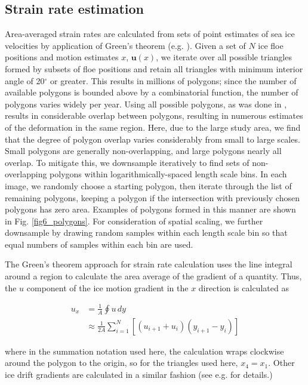 \documentclass[aog]{igs}
\begin{document}
\subsection{Strain rate estimation}
Area-averaged strain rates are calculated from sets of point estimates of sea ice velocities by application of Green's theorem (e.g. \cite{kwok2003_SubdailySea, Hutchings2012, rampal2019_MultifractalScaling, Dierking2020}).
Given a set of $N$ ice floe positions and motion estimates $x$,  $\mathbf{u}(x)$, we iterate over all possible triangles formed by subsets of floe positions and retain all triangles with minimum interior angle of 20$^\circ$ or greater.
This results in millions of polygons; since the number of available polygons is bounded above by a combinatorial function, the number of polygons varies widely per year. 
Using all possible polygons, as was done in \cite{itkin2017_ThinIce}, results in considerable overlap between polygons, resulting in numerous estimates of the deformation in the same region. Here, due to the large study area, we find that the degree of polygon overlap varies considerably from small to large scales. Small polygons are generally non-overlapping, and large polygons nearly all overlap. To mitigate this, we downsample iteratively to find sets of non-overlapping polygons within logarithmically-spaced length scale bins. In each image, we randomly choose a starting polygon, then iterate through the list of remaining polygons, keeping a polygon if the intersection with previously chosen polygons has zero area.
Examples of polygons formed in this manner are shown in Fig. \ref{fig6_polygons}.
For consideration of spatial scaling, we further downsample by drawing random samples within each length scale bin so that equal numbers of samples within each bin are used.

The Green's theorem approach for strain rate calculation uses the line integral around a region to calculate the area average of the gradient of a quantity.
Thus, the $u$ component of the ice motion gradient in the $x$ direction is calculated as
\begin{linenomath*}
\begin{align}
u_x & = \frac 1A \oint u \, dy \nonumber\\ 
& \approx  \frac{1}{2A} \sum_{i=1}^N \left[(u_{i+1} + u_i)(y_{i+1} - y_i)\right]
\end{align}
\end{linenomath*}
where in the summation notation used here, the calculation wraps clockwise around the polygon to the origin, so for the triangles used here, $x_4 = x_1$. Other ice drift gradients are calculated in a similar fashion (see e.g. \cite{lindsay2003_RADARSATGeophysical, Hutchings2018, bouchat2020_ReassessingQuality} for details.) 
\end{document}
